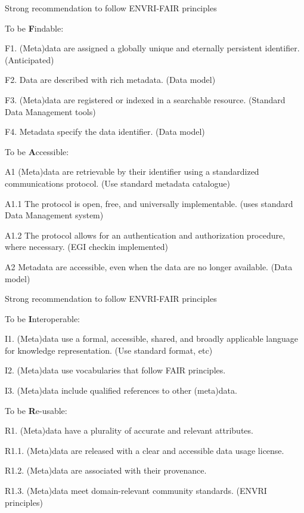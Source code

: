 \begin{frame}[fragile,t]
  \vspace{\mytopbit}
  {Strong recommendation to follow ENVRI-FAIR principles}
\bitm
  \item {To be {\bf F}indable:}
  \bitm
    \item F1. (Meta)data are assigned a globally unique and eternally persistent identifier. {\colblue (Anticipated)}
    \item F2. Data are described with rich metadata. {\colblue (\ED Data model)}
    \item F3. (Meta)data are registered or indexed in a searchable resource. {\colblue (Standard Data Management tools)}
    \item F4. Metadata specify the data identifier. {\colblue (\ED Data model)}
  \eitm
  \item {To be {\bf A}ccessible:}
  \bitm
    \item A1 (Meta)data are retrievable by their identifier using a standardized communications protocol. {\colblue (Use standard metadata catalogue)}
    \item A1.1 The protocol is open, free, and universally implementable. {\colblue (\ED uses standard Data Management system)}
    \item A1.2 The protocol allows for an authentication and authorization procedure, where necessary. {\colblue (EGI checkin implemented)}
    \item A2 Metadata are accessible, even when the data are no longer available. {\colblue (\ED Data model)}
  \eitm
\eitm
\end{frame}

\begin{frame}[fragile,t]
  \vspace{\mytopbit}
  {Strong recommendation to follow ENVRI-FAIR principles}
\bitm
\item {To be {\bf I}nteroperable:}
  \bitm
    \item I1. (Meta)data use a formal, accessible, shared, and broadly applicable language for knowledge representation. {\colblue (Use standard format, \HDF etc)}
    \item I2. (Meta)data use vocabularies that follow FAIR principles.
    \item I3. (Meta)data include qualified references to other (meta)data.
  \eitm
\item {To be {\bf R}e-usable:}
  \bitm
    \item R1. (Meta)data have a plurality of accurate and relevant attributes.
    \item R1.1. (Meta)data are released with a clear and accessible data usage license.
    \item R1.2. (Meta)data are associated with their provenance.
    \item R1.3. (Meta)data meet domain-relevant community standards. {\colblue (ENVRI principles)}
  \eitm
\eitm
\end{frame}
